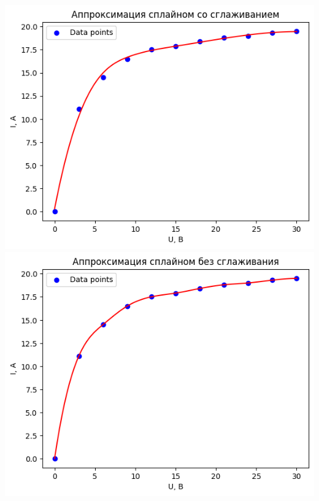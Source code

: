 \documentclass[12pt,openany]{book}
\begin{document}
\begin{center}
    \includegraphics[scale=0.59]{1} \\

    \includegraphics[scale=0.59]{2} \\
\end{center}

\newpage
\end{document}
